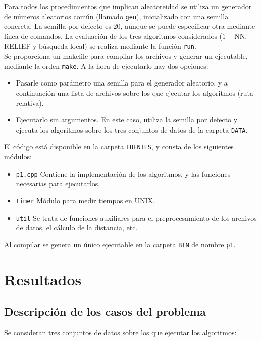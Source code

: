 \documentclass[12pt]{article}
\begin{document}
Para todos los procedimientos que implican aleatoreidad se utiliza un generador de números aleatorios común (llamado \verb|gen|), inicializado con una semilla concreta. La semilla por defecto es $20$, aunque se puede especificar otra mediante línea de comandos. La evaluación de los tres algoritmos considerados ($1-$NN, RELIEF y búsqueda local) se realiza mediante la función \verb|run|.\\

Se proporciona un makefile para compilar los archivos y generar un ejecutable, mediante la orden \verb|make|. A la hora de ejecutarlo hay dos opciones:

\begin{itemize}
    \item Pasarle como parámetro una semilla para el generador aleatorio, y a continuación una lista de archivos sobre los que ejecutar los algoritmos (ruta relativa).
    \item Ejecutarlo sin argumentos. En este caso, utiliza la semilla por defecto y ejecuta los algoritmos sobre los tres conjuntos de datos de la carpeta \verb|DATA|.
\end{itemize}

El código está disponible en la carpeta \verb|FUENTES|, y consta de los siguientes módulos:

\begin{itemize}
	\item \verb|p1.cpp| Contiene la implementación de los algoritmos, y las funciones necesarias para ejecutarlos.
	\item \verb|timer| Módulo para medir tiempos en UNIX.
	\item \verb|util| Se trata de funciones auxiliares para el preprocesamiento de los archivos de datos, el cálculo de la distancia, etc.
\end{itemize}

Al compilar se genera un único ejecutable en la carpeta \verb|BIN| de nombre \verb|p1|.

\newpage

\section{Resultados}

\subsection*{Descripción de los casos del problema}

Se consideran tres conjuntos de datos sobre los que ejecutar los algoritmos:
\end{document}

